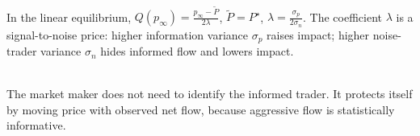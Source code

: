 \begin{model} \\
In the linear equilibrium, $Q(p_\infty)=\frac{p_\infty-\tilde{P}}{2\lambda}$, $\tilde{P}=P^\star$, $\lambda=\frac{\sigma_p}{2\sigma_n}$. The coefficient $\lambda$ is a signal-to-noise price: higher information variance $\sigma_p$ raises impact; higher noise-trader variance $\sigma_n$ hides informed flow and lowers impact.
\end{model}

\begin{principle} \\
The market maker does not need to identify the informed trader. It protects itself by moving price with observed net flow, because aggressive flow is statistically informative.
\end{principle}
